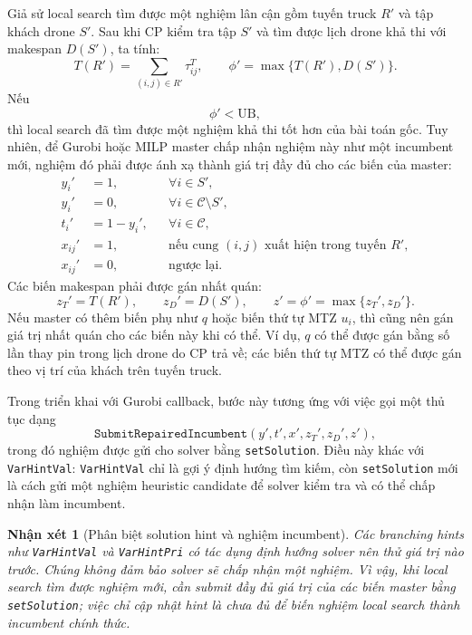 \documentclass[12pt,a4paper]{article}
\newtheorem{remark}{Nhận xét}
\newcommand{\C}{\mathcal{C}}
\newcommand{\UB}{\mathrm{UB}}
\begin{document}
Giả sử local search tìm được một nghiệm lân cận gồm tuyến truck $R'$ và tập khách drone $S'$. Sau khi CP kiểm tra tập $S'$ và tìm được lịch drone khả thi với makespan $D(S')$, ta tính:
\begin{equation}
    T(R')=\sum_{(i,j)\in R'}\tau^T_{ij},
    \qquad
    \phi' = \max\{T(R'),D(S')\}.
    \label{eq:ls-phi}
\end{equation}
Nếu
\[
    \phi'<\UB,
\]
thì local search đã tìm được một nghiệm khả thi tốt hơn của bài toán gốc. Tuy nhiên, để Gurobi hoặc MILP master chấp nhận nghiệm này như một incumbent mới, nghiệm đó phải được ánh xạ thành giá trị đầy đủ cho các biến của master:
\begin{align}
    y_i' &= 1, && \forall i\in S', \label{eq:ls-y-one}\\
    y_i' &= 0, && \forall i\in \C\setminus S', \label{eq:ls-y-zero}\\
    t_i' &= 1-y_i', && \forall i\in \C, \label{eq:ls-t}\\
    x_{ij}' &= 1, && \text{nếu cung }(i,j)\text{ xuất hiện trong tuyến }R', \label{eq:ls-x-one}\\
    x_{ij}' &= 0, && \text{ngược lại}. \label{eq:ls-x-zero}
\end{align}
Các biến makespan phải được gán nhất quán:
\begin{equation}
    z_T' = T(R'),
    \qquad
    z_D' = D(S'),
    \qquad
    z' = \phi' = \max\{z_T',z_D'\}.
    \label{eq:ls-z-values}
\end{equation}
Nếu master có thêm biến phụ như $q$ hoặc biến thứ tự MTZ $u_i$, thì cũng nên gán giá trị nhất quán cho các biến này khi có thể. Ví dụ, $q$ có thể được gán bằng số lần thay pin trong lịch drone do CP trả về; các biến thứ tự MTZ có thể được gán theo vị trí của khách trên tuyến truck.

Trong triển khai với Gurobi callback, bước này tương ứng với việc gọi một thủ tục dạng
\[
    \texttt{SubmitRepairedIncumbent}(y',t',x',z_T',z_D',z'),
\]
trong đó nghiệm được gửi cho solver bằng \texttt{setSolution}. Điều này khác với \texttt{VarHintVal}: \texttt{VarHintVal} chỉ là gợi ý định hướng tìm kiếm, còn \texttt{setSolution} mới là cách gửi một nghiệm heuristic candidate để solver kiểm tra và có thể chấp nhận làm incumbent.

\begin{remark}[Phân biệt solution hint và nghiệm incumbent]
Các branching hints như \texttt{VarHintVal} và \texttt{VarHintPri} có tác dụng định hướng solver nên thử giá trị nào trước. Chúng không đảm bảo solver sẽ chấp nhận một nghiệm. Vì vậy, khi local search tìm được nghiệm mới, cần submit đầy đủ giá trị của các biến master bằng \texttt{setSolution}; việc chỉ cập nhật hint là chưa đủ để biến nghiệm local search thành incumbent chính thức.
\end{remark}
\end{document}
